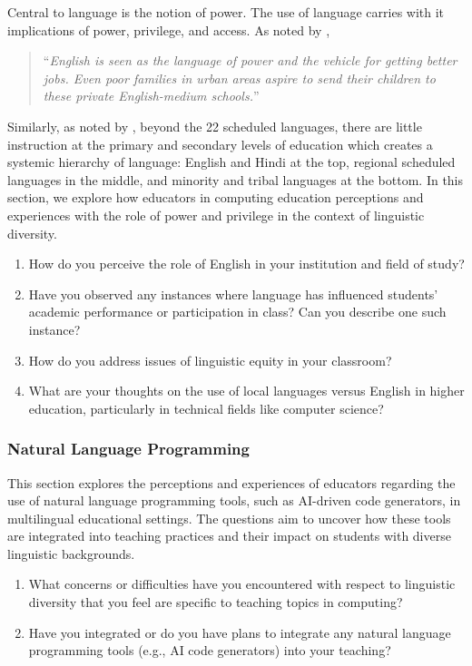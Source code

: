 {Central to language is the notion of power. The use of language carries with it
implications of power, privilege, and access. As noted by \citet{jhingran2009hundreds},
\begin{quote}
  ``\textit{English is seen as the language of power and the vehicle for getting better jobs. Even poor families in urban areas aspire to send their children to these private English-medium schools.}''
\end{quote}
Similarly, as noted by \citet{mohanty2017language}, beyond the 22 scheduled
languages, there are little instruction at the primary and secondary levels of
education which creates a systemic hierarchy of language: English and Hindi at
the top, regional scheduled languages in the middle, and minority and tribal
languages at the bottom. In this section, we explore how educators in computing
education perceptions and experiences with the role of power and privilege in
the context of linguistic diversity. 
\begin{enumerate}[label={LDP.\arabic*}, align=left, leftmargin=4em]
  \item How do you perceive the role of English in your institution and
    field of study?
  \item Have you observed any instances where language has influenced
    students' academic performance or participation in class? Can you describe
    one such instance?
  \item How do you address issues of linguistic equity in your classroom?
  \item What are your thoughts on the use of local languages versus
    English in higher education, particularly in technical fields like computer
    science?
\end{enumerate}

\subsubsection{Natural Language Programming}\label{subsubsec:natural-language-programming}

This section explores the perceptions and experiences of educators regarding
the use of natural language programming tools, such as AI-driven code
generators, in multilingual educational settings. The questions aim to uncover
how these tools are integrated into teaching practices and their impact on
students with diverse linguistic backgrounds.
\begin{enumerate}[label={NLP.\arabic*}, align=left, leftmargin=4em]
  \item What concerns or difficulties have you encountered with respect
    to linguistic diversity that you feel are specific to teaching topics in computing?
  \item Have you integrated or do you have plans to integrate any
    natural language programming tools (e.g., AI code generators) into your
    teaching? 
\end{enumerate}


}
